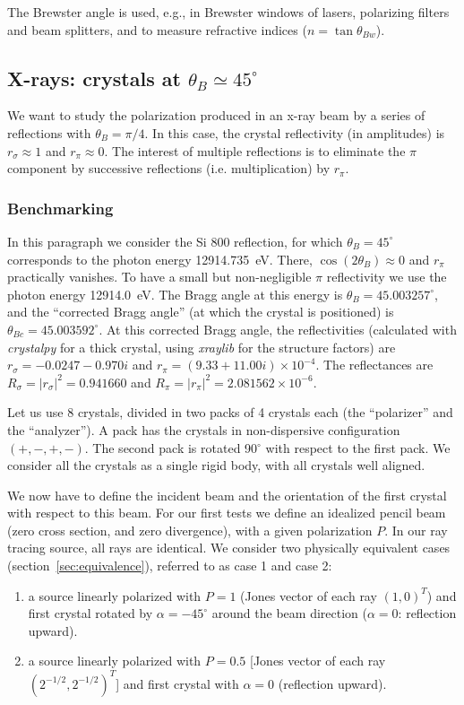 \documentclass{iucr}
\begin{document}
The Brewster angle is used, e.g., in Brewster windows of lasers, polarizing filters and beam splitters, and to measure refractive indices ($n=\tan\theta_{Bw}$).

\subsection{X-rays: crystals at $\theta_B\simeq45^\circ$}\label{sec:polarizers45degBenchmark}
We want to study the polarization produced in an x-ray beam by a series of reflections with $\theta_B=\pi/4$. In this case, the crystal reflectivity (in amplitudes) is $r_\sigma \approx 1$ and $r_\pi \approx 0$. The interest of multiple reflections is to eliminate the $\pi$ component by successive reflections (i.e. multiplication) by $r_\pi$.

\subsubsection{Benchmarking}

In this paragraph we consider the Si 800 reflection, for which $\theta_B=45^{\circ}$ corresponds to the photon energy 12914.735~eV. There, $\cos(2\theta_B)\approx 0$ and $r_\pi$ practically vanishes. To have a small but non-negligible $\pi$ reflectivity we use the photon energy 12914.0~eV. The Bragg angle at this energy is $\theta_B=45.003257^{\circ}$, and the ``corrected Bragg angle'' (at which the crystal is positioned) is $\theta_{Bc}=45.003592^{\circ}$.
At this corrected Bragg angle, the reflectivities (calculated with {\it crystalpy} for a thick crystal, using {\it xraylib} for the structure factors) are $r_\sigma=-0.0247-0.970 i$ and $r_\pi=(9.33+11.00 i)\times10^{-4}$.
The reflectances are $R_\sigma=|r_\sigma|^2=0.941660$ and
$R_\pi=|r_\pi|^2=2.081562\times10^{-6}$.

Let us use 8 crystals, divided in two packs of 4 crystals each (the ``polarizer'' and the ``analyzer''). A pack has the crystals in non-dispersive configuration $(+,-,+,-)$. The second pack is rotated 90$^\circ$ with respect to the first pack. We consider all the crystals as a single rigid body, with all crystals well aligned.

We now have to define the incident beam and the orientation of the first crystal with respect to this beam. For our first tests we define an idealized pencil beam (zero cross section, and zero divergence), with a given polarization $P$. In our ray tracing source, all rays are identical. We consider two physically equivalent cases (section~\ref{sec:equivalence}), referred to as case 1 and case 2:
\begin{enumerate}
    \item a source linearly polarized with $P=1$ (Jones vector of each ray $(1,0)^T$) and first crystal rotated by $\alpha=-45^\circ$ around the beam direction ($\alpha=0$: reflection upward).
    \item a source linearly polarized with $P=0.5$ [Jones vector of each ray $(2^{-1/2},2^{-1/2})^T$] and first crystal with $\alpha=0$ (reflection upward).    
\end{enumerate}
\end{document}
